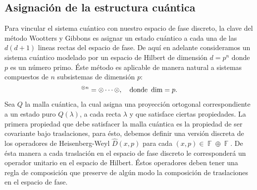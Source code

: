\documentclass[a4paper]{report}
\DeclareMathOperator{\F}{\mathbb{F}}
\let\H\relax
\DeclareMathOperator{\H}{\mathcal H}
\begin{document}
  \subsection{Asignación de la estructura cuántica}

  Para vincular el sistema cuántico con nuestro espacio de
  fase discreto, la clave del método Wootters y Gibbons es
  asignar un estado cuántico a cada una de las $d(d+1)$
  lineas rectas del espacio de fase. De aquí en adelante
  consideramos un sistema cuántico modelado por un espacio
  de Hilbert de dimensión $d = p^{n}$ donde $p$ es un número
  primo. Éste método es aplicable de manera natural a
  sistemas compuestos de $n$ subsistemas de dimensión $p$:
  \begin{equation}
    \H^{\otimes n}
    = \H \otimes \cdots \otimes \H,
    \quad
    \text{donde } \dim\H = p.
  \end{equation}
  Sea $Q$ la malla cuántica, la cual asigna una proyección
  ortogonal correspondiente a un estado puro $Q(\lambda)$, a
  cada recta $\lambda$ y que satisface ciertas propiedades.
  La primera propiedad que debe satisfacer la malla cuántica
  es la propiedad de ser covariante bajo traslaciones, para
  ésto, debemos definir una versión discreta de los
  operadores de Heisenberg-Weyl $\hat D(x,p)$ para cada
  $(x,p) \in \F \oplus \F$. De ésta manera a cada traslación
  en el espacio de fase discreto le corresponderá un
  operador unitario en el espacio de Hilbert. Éstos
  operadores deben tener una regla de composición que
  preserve de algún modo la composición de traslaciones en
  el espacio de fase. 
\end{document}
